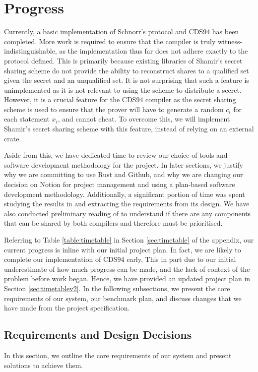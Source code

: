 \section{Progress}
\label{sec:progress}
Currently, a basic implementation of Schnorr's protocol and CDS94 has been completed. More work is required to ensure that the compiler is truly witness-indistinguishable, as the implementation thus far does not adhere exactly to the protocol defined. This is primarily because existing libraries of Shamir's secret sharing scheme do not provide the ability to reconstruct shares to a qualified set given the secret and an unqualified set. It is not surprising that such a feature is unimplemented as it is not relevant to using the scheme to distribute a secret. However, it is a crucial feature for the CDS94 compiler as the secret sharing scheme is used to ensure that the prover will have to generate a random $c_i$ for each statement $x_i$, and cannot cheat. To overcome this, we will implement Shamir's secret sharing scheme with this feature, instead of relying on an external crate. 

Aside from this, we have dedicated time to review our choice of tools and software development methodology for the project. In later sections, we justify why we are committing to use Rust and Github, and why we are changing our decision on Notion for project management and using a plan-based software development methodology. Additionally, a significant portion of time was spent studying the results in \cite{CDS94} and extracting the requirements from its design. We have also conducted preliminary reading of \cite{StackingSigmas} to understand if there are any components that can be shared by both compilers and therefore must be prioritised. 

Referring to Table \ref{table:timetable} in Section \ref{sec:timetable} of the appendix, our current progress is inline with our initial project plan. In fact, we are likely to complete our implementation of CDS94 early. This in part due to our initial underestimate of how much progress can be made, and the lack of context of the problem before work began. Hence, we have provided an updated project plan in Section \ref{sec:timetablev2}. In the following subsections, we present the core requirements of our system, our benchmark plan, and discuss changes that we have made from the project specification. 

\subsection{Requirements and Design Decisions}
In this section, we outline the core requirements of our system and present solutions to achieve them.

